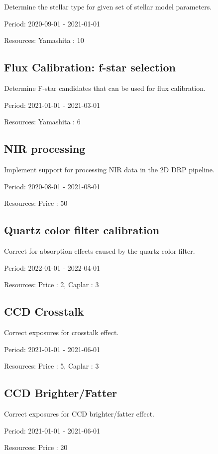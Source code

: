 Determine the stellar type for given set of stellar model parameters.

Period: 2020-09-01 - 2021-01-01

Resources: Yamashita : 10

\subsection{Flux Calibration: f-star selection}

Determine F-star candidates that can be used for flux calibration.

Period: 2021-01-01 - 2021-03-01

Resources: Yamashita : 6

\subsection{NIR processing}

Implement support for processing NIR data in the 2D DRP pipeline.

Period: 2020-08-01 - 2021-08-01

Resources: Price : 50

\subsection{Quartz color filter calibration}

Correct for absorption effects caused by the quartz color filter.

Period: 2022-01-01 - 2022-04-01

Resources: Price : 2, Caplar : 3

\subsection{CCD Crosstalk}

Correct exposures for crosstalk effect.

Period: 2021-01-01 - 2021-06-01

Resources: Price : 5, Caplar : 3

\subsection{CCD Brighter/Fatter}

Correct exposures for CCD brighter/fatter effect.

Period: 2021-01-01 - 2021-06-01

Resources: Price : 20

